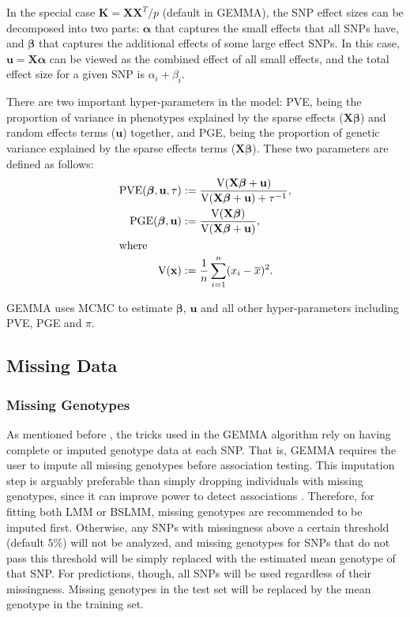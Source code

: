 \documentclass[11pt]{article}
\newcommand{\bu}{\mathbf{u}}
\newcommand{\bK}{\mathbf{K}}
\newcommand{\bX}{\mathbf{X}}
\newcommand{\bbeta}{\boldsymbol\beta}
\newcommand{\balpha}{\boldsymbol\alpha}
\begin{document}
In the special case $\bK=\bX\bX^T/p$ (default in GEMMA), the SNP effect sizes can be decomposed into two parts: $\balpha$ that captures the small effects that all SNPs have, and $\bbeta$ that captures the additional effects of some large effect SNPs. In this case, $\bu=\bX\balpha$ can be viewed as the combined effect of all small effects, and the total effect size for a given SNP is $\alpha_i+\beta_i$. 

There are two important hyper-parameters in the model: PVE, being the proportion of variance in phenotypes explained by the sparse effects ($\bX\bbeta$) and random effects terms ($\bu$) together, and PGE, being the proportion of genetic variance explained by the sparse effects terms ($\mathbf X\boldsymbol\beta$). These two parameters are defined as follows:
\begin{align*}
\mbox{PVE}(\bbeta, \bu, \tau) & :=\frac{\mbox{V}(\bX\bbeta+\bu)}{\mbox{V}(\bX\bbeta+\bu)+\tau^{-1}}, \\  
\mbox{PGE}(\bbeta, \bu) & :=\frac{\mbox{V}(\bX\bbeta)}{\mbox{V}(\bX\bbeta+\bu)}, \\
\intertext{where}  
\mbox{V}({\bf x}) &:=\frac{1}{n}\sum_{i=1}^n (x_i-\overline {x})^2.
\end{align*}

GEMMA uses MCMC to estimate $\boldsymbol\beta$, $\mathbf u$ and all other hyper-parameters including PVE, PGE and $\pi$. 



\subsection{Missing Data}
\subsubsection{Missing Genotypes}
As mentioned before \cite{Zhou:2012}, the tricks used in the GEMMA algorithm rely on having complete or imputed genotype data at each SNP. That is, GEMMA requires the user to impute all missing genotypes before association testing. This imputation step is arguably preferable than simply dropping individuals with missing genotypes, since it can improve power to detect associations \cite{Guan:2008}. Therefore, for fitting both LMM or BSLMM, missing genotypes are recommended to be imputed first. Otherwise, any SNPs with missingness above a certain threshold (default $5\%$) will not be analyzed, and missing genotypes for SNPs that do not pass this threshold will be simply replaced with the estimated mean genotype of that SNP. For predictions, though, all SNPs will be used regardless of their missingness. Missing genotypes in the test set will be replaced by the mean genotype in the training set.
\end{document}
